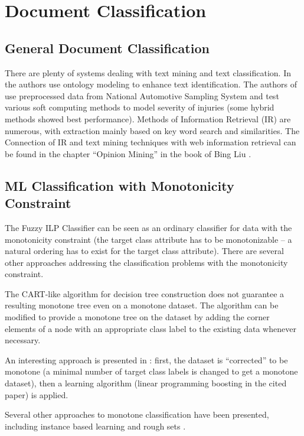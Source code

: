 \section{Document Classification} \label{sec:relwork_doc_classification} 

\subsection{General Document Classification}

There are plenty of systems dealing with text mining and text classification. In \citep{biblio:ReYaLiOntoText08} the authors use ontology modeling to enhance text identification. The authors of \citep{biblio:CAP} use preprocessed data from National Automotive Sampling System and test various soft computing methods to model severity of injuries (some hybrid methods showed best performance). Methods of Information Retrieval (IR) are numerous, with extraction mainly based on key word search and similarities. The Connection of IR and text mining techniques with web information retrieval can be found in the chapter ``Opinion Mining'' in the book of Bing Liu \citep{biblio:WebDataMining}. 

\subsection{ML Classification with Monotonicity Constraint}
The Fuzzy ILP Classifier can be seen as an ordinary classifier for data with the monotonicity constraint (the target class attribute has to be monotonizable -- a natural ordering has to exist for the target class attribute). There are several other approaches addressing the classification problems with the monotonicity constraint.

The CART-like algorithm for decision tree construction does not guarantee a resulting monotone tree even on a monotone dataset. The algorithm can be modified \citep{biblio:mon_trees} to provide a monotone tree on the dataset by adding the corner elements of a node with an appropriate class label to the existing data whenever necessary.

An interesting approach is presented in \citep{biblio:mon_transf}: first, the dataset is ``corrected'' to be monotone (a minimal number of target class labels is changed to get a monotone dataset), then a learning algorithm (linear programming boosting in the cited paper) is applied.

Several other approaches to monotone classification have been presented, including instance based learning \citep{biblio:ibl} and rough sets \citep{biblio:rough_sets}.








